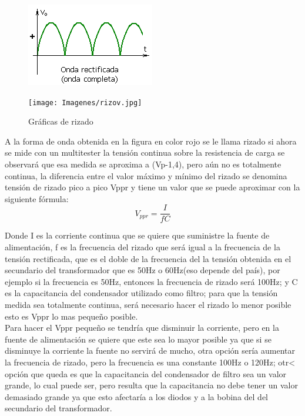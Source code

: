 \documentclass{article}
\begin{document}
\begin{figure}[h!]
    \centering
    \includegraphics[scale=0.8]{OndaCompleta.png}
    \label{fig:my_label}
\end{figure}


\begin{figure}[h!]
    \centering
    \texttt{[image: Imagenes/rizov.jpg]}
    \caption{Gráficas de rizado}
    \label{fig:rizado}
\end{figure}

 
A la forma de onda obtenida en la figura en color rojo se le llama rizado si ahora se mide con un multitester la tensión continua sobre la resistencia de carga se observará que esa medida se aproxima a (Vp-1,4), pero aún no es totalmente continua, la diferencia entre el valor máximo y mínimo del rizado se denomina tensión de rizado pico a pico Vppr y tiene un valor que se puede aproximar con la siguiente fórmula:\citep{FiltroParaCorrienteAlterna}\\

\begin{equation}
    V_{ppr}=\frac{I}{fC}
\end{equation}

Donde I es la corriente continua que se quiere que suministre la fuente de alimentación, f es la frecuencia del rizado que será igual a la frecuencia de la tensión rectificada, que es el doble de la frecuencia del la tensión obtenida en el secundario del transformador que es 50Hz o 60Hz(eso depende del país), por ejemplo si la frecuencia es 50Hz, entonces la frecuencia de rizado será 100Hz; y C es la capacitancia del condensador utilizado como filtro; para que la tensión medida sea totalmente continua, será necesario hacer el rizado lo menor posible esto es  Vppr lo mas pequeño posible.\citep{FiltroParaCorrienteAlterna}\\

Para hacer el Vppr pequeño se tendría que disminuir la corriente, pero en la fuente de alimentación se quiere que este sea lo mayor posible ya que si se disminuye la corriente la fuente no servirá de mucho, otra opción sería aumentar la frecuencia de rizado, pero la frecuencia es una constante 100Hz o 120Hz; otr< opción que queda es que la capacitancia del condensador de filtro sea un valor grande, lo  cual puede ser, pero resulta que la capacitancia no debe tener un valor demasiado grande ya que esto afectaría a los diodos y a la bobina del del secundario del transformador.\citep{FiltroParaCorrienteAlterna}
\end{document}

